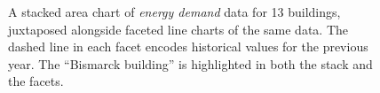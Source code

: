 \documentclass[journal]{vgtc}                %
\begin{document}
\begin{figure}[ht]
	\centering
	\vspace{-0.15cm}
	\caption{A stacked area chart of \textsl{energy demand} data for 13 buildings, juxtaposed alongside faceted line charts of the same data. The dashed line in each facet encodes historical values for the previous year. The ``Bismarck building'' is highlighted in both the stack and the facets.}
	\label{fig:sandbox-stacks}
	\vspace{-0.6cm}
\end{figure}
\end{document}
